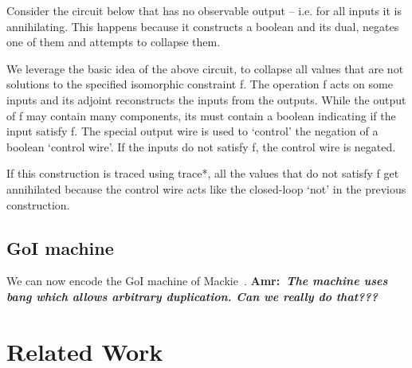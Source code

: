 \documentclass[preprint]{sigplanconf}
\newcommand{\xcomment}[2]{\textbf{#1:~\textsl{#2}}}
\newcommand{\amr}[1]{\xcomment{Amr}{#1}}
\begin{document}
Consider the circuit below that has no observable output -- i.e. for
all inputs it is annihilating. This happens because it constructs a
boolean and its dual, negates one of them and attempts to collapse
them.
\begin{center}
\end{center}  

We leverage the basic idea of the above circuit, to collapse all
values that are not solutions to the specified isomorphic constraint
{{f}}. The operation {{f}} acts on some inputs and its adjoint
reconstructs the inputs from the outputs. While the output of {{f}}
may contain many components, its must contain a boolean indicating if
the input satisfy {{f}}. The special output wire is used to `control'
the negation of a boolean `control wire'. If the inputs do not satisfy
{{f}}, the control wire is negated. 

\begin{center}
\end{center}  

If this construction is traced using {{trace*}}, all the values that
do not satisfy {{f}} get annihilated because the control wire acts
like the closed-loop `not' in the previous construction. 

\subsection{GoI machine}

We can now encode the GoI machine of
Mackie~\cite{Mackie2011,DBLP:conf/popl/Mackie95}. \amr{The machine uses bang
  which allows arbitrary duplication. Can we really do that???}

\section{Related Work} 
\label{sec:related}
\end{document}
